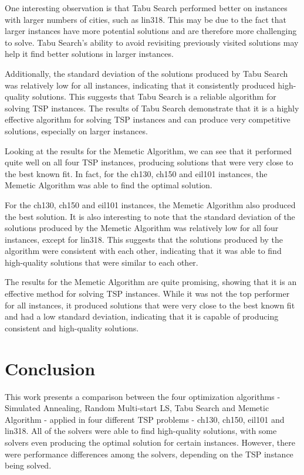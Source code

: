 \documentclass[conference]{IEEEtran}
\begin{document}
One interesting observation is that Tabu Search performed better on instances with larger numbers of cities, such as  lin318. This may be due to the fact that larger instances have more potential solutions and are therefore more challenging to solve. Tabu Search's ability to avoid revisiting previously visited solutions may help it find better solutions in larger instances.

Additionally, the standard deviation of the solutions produced by Tabu Search was relatively low for all instances, indicating that it consistently produced high-quality solutions. This suggests that Tabu Search is a reliable algorithm for solving TSP instances. The results of Tabu Search demonstrate that it is a highly effective algorithm for solving TSP instances and can produce very competitive solutions, especially on larger instances.

Looking at the results for the Memetic Algorithm, we can see that it performed quite well on all four TSP instances, producing solutions that were very close to the best known fit. In fact, for the ch130, ch150 and eil101 instances, the Memetic Algorithm was able to find the optimal solution.

For the ch130, ch150 and eil101 instances, the Memetic Algorithm also produced the best solution. It is also interesting to note that the standard deviation of the solutions produced by the Memetic Algorithm was relatively low for all four instances, except for lin318. This suggests that the solutions produced by the algorithm were consistent with each other, indicating that it was able to find high-quality solutions that were similar to each other.

The results for the Memetic Algorithm are quite promising, showing that it is an effective method for solving TSP instances. While it was not the top performer for all instances, it produced solutions that were very close to the best known fit and had a low standard deviation, indicating that it is capable of producing consistent and high-quality solutions.

\section{Conclusion}
This work presents a comparison between the four optimization algorithms - Simulated Annealing, Random Multi-start LS, Tabu Search and Memetic Algorithm - applied in four different TSP problems - ch130, ch150, eil101 and lin318. All of the solvers were able to find high-quality solutions, with some solvers even producing the optimal solution for certain instances. However, there were performance differences among the solvers, depending on the TSP instance being solved.
\end{document}
